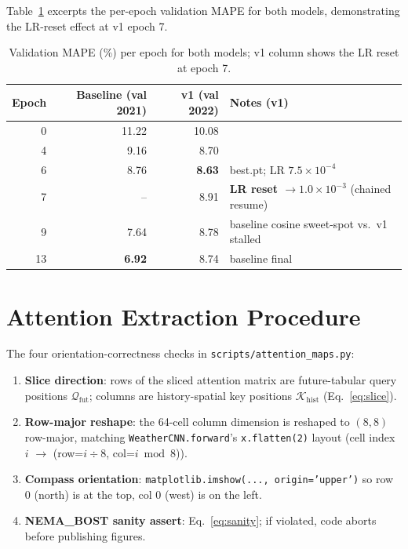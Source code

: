 \documentclass[11pt,letterpaper]{article}
\begin{document}
Table~\ref{tab:trajectory} excerpts the per-epoch validation MAPE for both models, demonstrating the LR-reset effect at v1 epoch 7.

\begin{table}[!h]
\centering
\small
\caption{Validation MAPE (\%) per epoch for both models; v1 column shows the LR reset at epoch 7.}
\label{tab:trajectory}
\begin{tabular}{@{}rrrl@{}}
\toprule
Epoch & Baseline (val 2021) & v1 (val 2022) & Notes (v1) \\
\midrule
0 & 11.22 & 10.08 & \\
4 & 9.16  & 8.70  & \\
6 & 8.76  & \textbf{8.63} & best.pt; LR $7.5\!\times\!10^{-4}$ \\
7 & --    & 8.91  & \textbf{LR reset $\to 1.0\!\times\!10^{-3}$} (chained resume) \\
9 & 7.64  & 8.78  & baseline cosine sweet-spot vs.\ v1 stalled \\
13 & \textbf{6.92} & 8.74 & baseline final \\
\bottomrule
\end{tabular}
\end{table}

\section{Attention Extraction Procedure}
\label{app:extraction}

The four orientation-correctness checks in \texttt{scripts/attention\_maps.py}:

\begin{enumerate}
  \item \textbf{Slice direction}: rows of the sliced attention matrix are future-tabular query positions $\mathcal{Q}_{\mathrm{fut}}$; columns are history-spatial key positions $\mathcal{K}_{\mathrm{hist}}$ (Eq.~\eqref{eq:slice}).
  \item \textbf{Row-major reshape}: the 64-cell column dimension is reshaped to $(8, 8)$ row-major, matching \texttt{WeatherCNN.forward}'s \texttt{x.flatten(2)} layout (cell index $i$ $\to$ (row=$i\div 8$, col=$i\bmod 8$)).
  \item \textbf{Compass orientation}: \texttt{matplotlib.imshow(..., origin='upper')} so row 0 (north) is at the top, col 0 (west) is on the left.
  \item \textbf{NEMA\_BOST sanity assert}: Eq.~\eqref{eq:sanity}; if violated, code aborts before publishing figures.
\end{enumerate}
\end{document}
